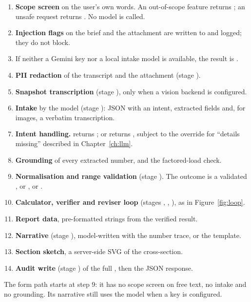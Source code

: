 \begin{enumerate}
  \item \textbf{Scope screen} on the user's own words. An out-of-scope feature returns ; an unsafe request returns . No model is called.
  \item \textbf{Injection flags} on the brief and the attachment are written to  and logged; they do not block.
  \item If neither a Gemini key nor a local intake model is available, the result is .
  \item \textbf{PII redaction} of the transcript and the attachment (stage ).
  \item \textbf{Snapshot transcription} (stage ), only when a vision backend is configured.
  \item \textbf{Intake} by the model (stage ): JSON with an intent, extracted fields and, for images, a verbatim transcription.
  \item \textbf{Intent handling.}  returns ;  or  returns , subject to the override for ``details missing'' described in Chapter~\ref{ch:llm}.
  \item \textbf{Grounding} of every extracted number, and the factored-load check.
  \item \textbf{Normalisation and range validation} (stage ). The outcome is a validated , or ,  or .
  \item \textbf{Calculator, verifier and reviser loop} (stages , , ), as in Figure~\ref{fig:loop}.
  \item \textbf{Report data}, pre-formatted strings from the verified result.
  \item \textbf{Narrative} (stage ), model-written with the number trace, or the template.
  \item \textbf{Section sketch}, a server-side SVG of the cross-section.
  \item \textbf{Audit write} (stage ) of the full , then the JSON response.
\end{enumerate}
The form path starts at step 9: it has no scope screen on free text, no intake and no grounding. Its narrative still uses the model when a key is configured.

